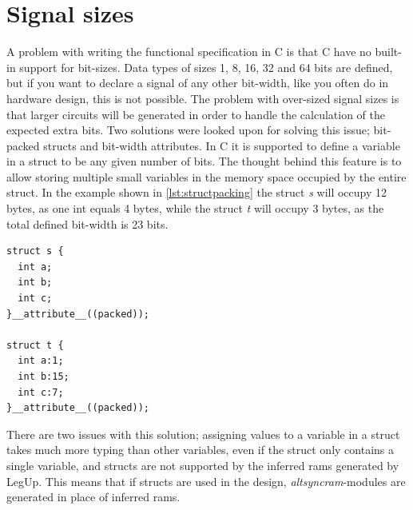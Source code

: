 \section{Signal sizes}
A problem with writing the functional specification in C is that C have no built-in support for bit-sizes. Data types of sizes 1, 8, 16, 32 and 64 bits are defined, but if you want to declare a signal of any other bit-width, like you often do in hardware design, this is not possible. The problem with over-sized signal sizes is that larger circuits will be generated in order to handle the calculation of the expected extra bits. Two solutions were looked upon for solving this issue; bit-packed structs and bit-width attributes. In C it is supported to define a variable in a struct to be any given number of bits. The thought behind this feature is to allow storing multiple small variables in the memory space occupied by the entire struct. In the example shown in \cref{lst:structpacking} the struct \textit{s} will occupy 12 bytes, as one int equals 4 bytes, while the struct \textit{t} will occupy 3 bytes, as the total defined bit-width is 23 bits.
\begin{lstlisting}[caption={Struct bit-packing example},label=lst:structpacking]
struct s {
  int a;
  int b;
  int c;
}__attribute__((packed));

struct t {
  int a:1;
  int b:15;
  int c:7;
}__attribute__((packed));
\end{lstlisting}
There are two issues with this solution; assigning values to a variable in a struct takes much more typing than other variables, even if the struct only contains a single variable, and structs are not supported by the inferred \gls{ram}s generated by LegUp. This means that if structs are used in the design, \textit{altsyncram}-modules are generated in place of inferred \gls{ram}s.

